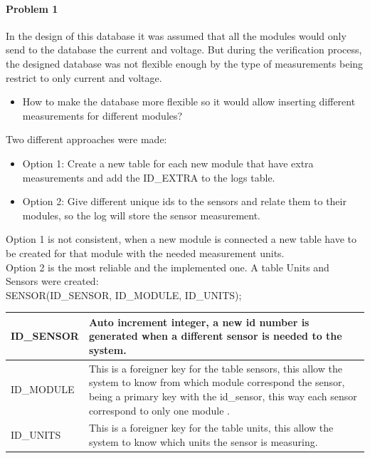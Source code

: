 \paragraph{Problem 1}
In the design of this database it was assumed that all the modules would only send to the database the current and voltage. But during the verification process, the designed database was not flexible enough by the type of measurements being restrict to only current and voltage.

	\begin{itemize}
		\item How to make the database more flexible so it would allow inserting different measurements for different modules?
	\end{itemize}

Two different approaches were made:
	
	\begin{itemize}
		\item Option 1: Create a new table for each new module that have extra measurements and add the ID\_EXTRA to the logs table.
		\item Option 2: Give different unique ids to the sensors and relate them to their modules, so the log will store the sensor measurement.
	\end{itemize}

Option 1 is not consistent, when a new module is connected a new table have to be created for that module with the needed measurement units.\\

Option 2 is the most reliable and the implemented one. A table Units and Sensors were created:\\

SENSOR(ID\_SENSOR, ID\_MODULE, ID\_UNITS);

\begin{table}[H]
\centering
	\begin{tabular}{| p{2cm} | p{10cm} |}
		\hline
		ID\_SENSOR & Auto increment integer, a new id number is generated when a different sensor is needed to the system. \\\hline
		ID\_MODULE & This is a foreigner key for the table sensors, this allow the system to know from which module correspond the sensor, being a primary key with the id\_sensor, this way each sensor correspond to only one module .\\\hline
		ID\_UNITS & This is a foreigner key for the table units, this allow the system to know which units the sensor is measuring.\\\hline
	\end{tabular}
\end{table}

